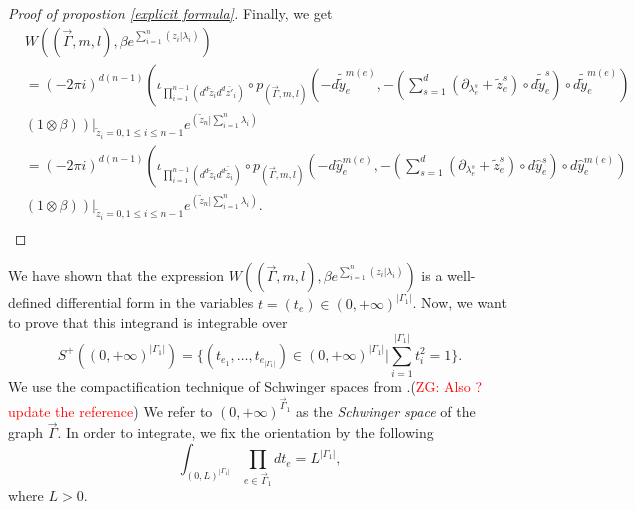 \documentclass[11pt]{amsart}
\theoremstyle{definition}
\theoremstyle{remark}
\numberwithin{equation}{section}
\newcommand{\Gui}[1]{(\textcolor{red}{ZG: #1})}
\begin{document}
\begin{proof}[Proof of propostion \ref{explicit formula}]
    Finally, we get
    \begin{align*}
        &W((\vec{\Gamma},m,l),\beta e^{\sum\limits_{i=1}^{n}(z_{i}|\lambda_{i})})\\
        &=(-2\pi i)^{d(n-1)}\left(
        \iota_{\prod_{i=1}^{n-1}(d^{d}\tilde{z}_{i}d^{d}\bar{z'}_{i})}\circ p_{(\vec{\Gamma},m,l)}(-d\tilde{\tilde{y}}_{e}^{m(e)},-(\sum_{s=1}^{d}(\partial_{\lambda_{e}^{s}}+\tilde{z}_{e}^{s})\circ d\tilde{\tilde{y}}_{e}^{s})\circ d\tilde{\tilde{y}}_{e}^{m(e)})
        \right.\\
        &\left.\left.(1\otimes \beta)\right)\right|_{\tilde{z}_{i}=0,1\leq i\leq n-1} e^{(\tilde{z}_{n}|\sum\limits_{i=1}^{n}\lambda_{i})}\\
        &=(-2\pi i)^{d(n-1)}\left(
        \iota_{\prod_{i=1}^{n-1}(d^{d}\tilde{z}_{i}d^{d}\bar{\tilde{z}}_{i})}\circ p_{(\vec{\Gamma},m,l)}(-d\hat{y}_{e}^{m(e)},-(\sum_{s=1}^{d}(\partial_{\lambda_{e}^{s}}+\tilde{z}_{e}^{s})\circ d\hat{y}_{e}^{s})\circ d\hat{y}_{e}^{m(e)})
        \right.\\
        &\left.\left.(1\otimes \beta)\right)\right|_{\tilde{z}_{i}=0,1\leq i\leq n-1} e^{(\tilde{z}_{n}|\sum\limits_{i=1}^{n}\lambda_{i})}.\\
    \end{align*}
\end{proof}

We have shown that the expression $W((\vec{\Gamma},m,l),\beta e^{\sum\limits_{i=1}^{n}(z_{i}|\lambda_{i})})$ is a
well-defined differential form in the variables $t = (t_e) \in (0,+\infty)^{|\Gamma_1|}$.
Now, we want to prove that this integrand is integrable over
$$
S^{+}((0,+\infty)^{|\Gamma_{1}|})=\{(t_{e_{1}},\dots,t_{e_{|\Gamma_{1}|}})\in(0,+\infty)^{|\Gamma_{1}|}|\sum_{i=1}^{|\Gamma_{1}|}t_{i}^{2}=1\}.
$$
We use the compactification technique of Schwinger spaces from \cite{Wang:2024tjf}.\Gui{Also \cite{wang2024feynman}? update the reference}
We refer to $(0,+\infty)^{\vec{\Gamma}_{1}}$ as the \textit{Schwinger space} of the graph $\vec{\Gamma}$.
In order to integrate, we fix the orientation by the following
    $$
    \int_{(0,L)^{|\Gamma_{1}|}}\prod_{e\in\vec{\Gamma}_{1}}dt_{e}=L^{|\Gamma_{1}|},
    $$
    where $L>0$.
\end{document}
